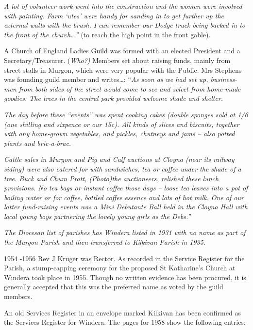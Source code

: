 \emph{A lot of volunteer work went into the construction and the women
were involved with painting. Farm `utes' were handy for sanding in to
get further up the external walls with the brush. I can remember our
Dodge truck being backed in to the front of the church\ldots''} (to
reach the high point in the front gable).

A Church of England Ladies Guild was formed with an elected President
and a Secretary/Treasurer. (\emph{Who?)} Members set about raising
funds, mainly from street stalls in Murgon, which were very popular with
the Public. Mrs Stephens was founding guild member and writes\ldots:
``\emph{As soon as we had set up, business-men from both sides of the
street would come to see and select from home-made goodies. The trees in
the central park provided welcome shade and shelter.}

\emph{The day before these ``events'' was spent cooking cakes (double
sponges sold at 1/6 (one shilling and sixpence or our 15c). All kinds of
slices and biscuits, together with any home-grown vegetables, and
pickles, chutneys and jams -- also potted plants and bric-a-brac.}

\emph{Cattle sales in Murgon and Pig and Calf auctions at Cloyna (near
its railway siding) were also catered for with sandwiches, tea or coffee
under the shade of a tree. Buck and Chum Pratt, (Photo)the auctioneers,
relished these lunch provisions. No tea bags or instant coffee those
days -- loose tea leaves into a pot of boiling water or for coffee,
bottled coffee essence and lots of hot milk. One of our latter
fund-raising events was a Mini Debutante Ball held in the Cloyna Hall
with local young boys partnering the lovely young girls as the Debs.''}

\emph{The Diocesan list of parishes has Windera listed in 1931 with no
name as part of the Murgon Parish and then transferred to Kilkivan
Parish in 1935.}

1954 -1956 Rev J Kruger was Rector. As recorded in the Service Register
for the Parish, a stump-capping ceremony for the proposed St Katharine's
Church at Windera took place in 1955. Though no written evidence has
been procured, it is generally accepted that this was the preferred name
as voted by the guild members.

An old Services Register in an envelope marked Kilkivan has been
confirmed as the Services Register for Windera. The pages for 1958 show
the following entries:

